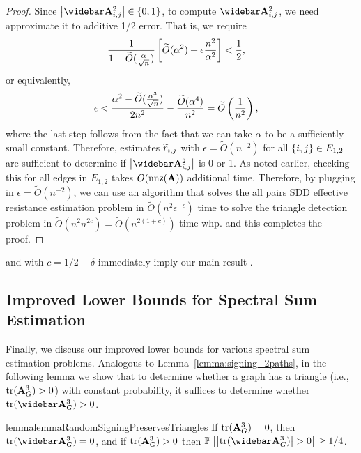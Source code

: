 \begin{proof}
Since $\Abs{\Abar^2_{i,j}} \in \{0, 1\}$, to compute $\Abar^2_{i,j}$, we need approximate it to additive 1/2 error. That is, we require 
\begin{align*}
    \frac{1}{1 - \widetilde{O}( {\frac{\alpha}{\sqrt{n}}} )} \left[{\widetilde{O}( {\alpha^2} )} + \epsilon \frac{n^2}{\alpha^2} \right] &< \frac{1}{2},
\end{align*}
or equivalently, 
\begin{align*}
    \epsilon &< \frac{{\alpha^2 - \widetilde{O}( {\frac{\alpha^3}{\sqrt{n}}} )}}{2n^2} - \frac{\widetilde{O}( {\alpha^4} )}{n^2} = \widetilde{O}\left( \frac{1}{n^2} \right),
\end{align*}
where the last step follows from the fact that we can take $\alpha$ to be a sufficiently small constant. Therefore, estimates $\widetilde{r}_{i,j}$ with $\epsilon = \widetilde{O}(n^{-2})$ for all $\left\{ i, j \right\} \in E_{1,2}$ are sufficient to determine if $\Abs{\Abar^2_{i,j}}$ is 0 or 1. As noted earlier, checking this for all edges in $E_{1,2}$ takes $O(\mathrm{nnz} (\mathbf{A}))$ additional time. Therefore, by plugging in $\epsilon = \widetilde{O}(n^{-2})$, we can use an algorithm that solves the all pairs SDD effective resistance estimation problem in $\widetilde{O}(n^2 \epsilon^{-c})$ time to solve the triangle detection problem in $\widetilde{O}(n^2 n^{2c}) = \widetilde{O}(n^{2(1+c)})$ time whp. and this completes the proof.  
\end{proof}

 and  with $c = 1/2 - \delta$ immediately imply our main result .

\subsection{Improved Lower Bounds for Spectral Sum Estimation} \label{sec:improved_lower_bounds_spectral_sums}
Finally, we discuss our improved lower bounds for various spectral sum estimation problems. Analogous to Lemma~\ref{lemma:signing_2paths}, in the following lemma we show that to determine whether a graph has a triangle (i.e., $\mathrm{tr}(\mathbf{A}_{G}^3) > 0$) with constant probability, it suffices to determine whether $\trace{\As_{G}^3} > 0$.

\begin{restatable}{lemma}{lemmaRandomSigningPreservesTriangles}\label{lemma:random_signing_preserves_triangles}
    If $\mathrm{tr}(\mathbf{A}_G^3) = 0$, then $\trace{\As_G^3} = 0$, and if $\mathrm{tr}(\mathbf{A}_G^3) > 0$ then $\Prob{\abs{\trace{\As_G^3}} > 0} \geq 1/4$. 
\end{restatable}

